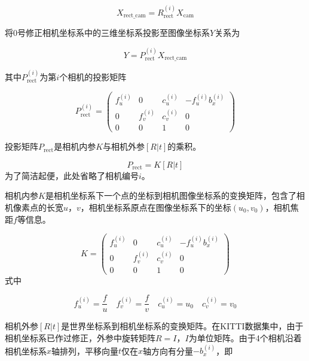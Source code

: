 \begin{equation}
    X_{\text{rect\_cam}} = R_{\text{rect}}^{(i)} X_{\text{cam}}
\end{equation}

将0号修正相机坐标系中的三维坐标系投影至图像坐标系$Y$关系为

\begin{equation}
    Y = P_{\text{rect}}^{(i)}X_{\text{rect\_cam}}
\end{equation}

其中$P_{\text{rect}}^{(i)}$为第$i$个相机的投影矩阵

\begin{equation}
    {P}_{\text {rect }}^{(i)}=
    \left(\begin{array}{cccc}
        f_{u}^{(i)} & 0 & c_{u}^{(i)} & -f_{u}^{(i)} b_{x}^{(i)} \\
        0 & f_{v}^{(i)} & c_{v}^{(i)} & 0 \\
        0 & 0 & 1 & 0
    \end{array}\right)
\end{equation}

投影矩阵${P}_{\text{rect}}$是相机内参$K$与相机外参$[R|t]$的乘积。

\begin{equation}
    {P}_{\text{rect}} = K[R|t]
    \label{eq2.6}
\end{equation}
为了简洁起便，此处省略了相机编号$i$。 

相机内参$K$是相机坐标系下一个点的坐标到相机图像坐标系的变换矩阵，包含了相机像素点的长宽$u$，$v$，相机坐标系原点在图像坐标系下的坐标$(u_0,v_0)$，相机焦距$f$等信息。

\begin{equation}
    K = 
    \left(\begin{array}{cccc}
        f_{u}^{(i)} & 0 & c_{u}^{(i)} & -f_{u}^{(i)} b_{x}^{(i)} \\
        0 & f_{v}^{(i)} & c_{v}^{(i)} & 0 \\
        0 & 0 & 1 & 0
    \end{array}\right)
\end{equation}
式中

\begin{equation}
    f_{u}^{(i)} = \frac{f}{u}\quad
    f_{v}^{(i)} = \frac{f}{v}\quad
    c_{u}^{(i)} = u_0\quad
    c_{v}^{(i)} = v_0
\end{equation}

相机外参$[R|t]$是世界坐标系到相机坐标系的变换矩阵。在KITTI数据集中，由于相机坐标系已作过修正，外参中旋转矩阵$R=I$，$I$为单位矩阵。由于4个相机沿着相机坐标系$x$轴排列，平移向量$t$仅在$x$轴方向有分量$-b_x^{(i)}$，即

